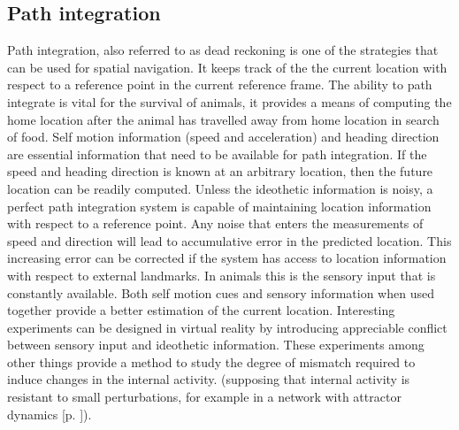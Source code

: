 \subsection{Path integration}
\label{pathIntgr}
Path integration, also referred to as dead reckoning is one of the strategies that can be used for spatial navigation. It keeps track of the the current location with respect to a reference point in the current reference frame. The ability to path integrate is vital for the survival of animals, it provides a means of computing the home location after the animal has travelled away from home location in search of food.
Self motion information (speed and acceleration) and heading direction are essential information that need to be available for path integration. If the speed and heading direction is known at an arbitrary location, then the future location can be readily computed. Unless the ideothetic information is noisy, a perfect path integration system is capable of maintaining location information with respect to a reference point. Any noise that enters the measurements of speed and direction will lead to accumulative error in the predicted location. This increasing error can be corrected if the system has access to location information with respect to external landmarks. In animals this is the sensory input that is constantly available. Both self motion cues and sensory information when used together provide a better estimation of the current location. Interesting experiments can be designed in virtual reality by introducing appreciable conflict between sensory input and ideothetic information. These experiments among other things provide a method to study the degree of mismatch required to induce changes in the internal activity. (supposing that internal activity is resistant to small perturbations, for example in a network with attractor dynamics [p. \pageref{fixedpt}]). 

